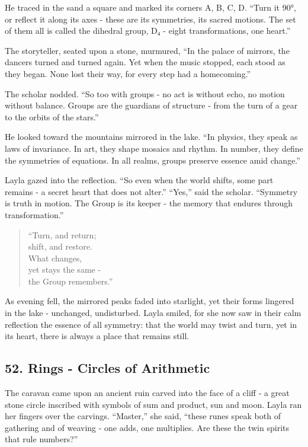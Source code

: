 \documentclass[
  letterpaper,
  DIV=11,
  numbers=noendperiod]{scrreprt}
\begin{document}
He traced in the sand a square and marked its corners A, B, C, D. ``Turn
it 90°, or reflect it along its axes - these are its symmetries, its
sacred motions. The set of them all is called the dihedral group, D₄ -
eight transformations, one heart.''

The storyteller, seated upon a stone, murmured, ``In the palace of
mirrors, the dancers turned and turned again. Yet when the music
stopped, each stood as they began. None lost their way, for every step
had a homecoming.''

The scholar nodded. ``So too with groups - no act is without echo, no
motion without balance. Groups are the guardians of structure - from the
turn of a gear to the orbits of the stars.''

He looked toward the mountains mirrored in the lake. ``In physics, they
speak as laws of invariance. In art, they shape mosaics and rhythm. In
number, they define the symmetries of equations. In all realms, groups
preserve essence amid change.''

Layla gazed into the reflection. ``So even when the world shifts, some
part remains - a secret heart that does not alter.'' ``Yes,'' said the
scholar. ``Symmetry is truth in motion. The Group is its keeper - the
memory that endures through transformation.''

\begin{quote}
``Turn, and return;\\
shift, and restore.\\
What changes,\\
yet stays the same -\\
the Group remembers.''
\end{quote}

As evening fell, the mirrored peaks faded into starlight, yet their
forms lingered in the lake - unchanged, undisturbed. Layla smiled, for
she now saw in their calm reflection the essence of all symmetry: that
the world may twist and turn, yet in its heart, there is always a place
that remains still.

\subsection{52. Rings - Circles of
Arithmetic}\label{rings---circles-of-arithmetic}

The caravan came upon an ancient ruin carved into the face of a cliff -
a great stone circle inscribed with symbols of sum and product, sun and
moon. Layla ran her fingers over the carvings. ``Master,'' she said,
``these runes speak both of gathering and of weaving - one adds, one
multiplies. Are these the twin spirits that rule numbers?''
\end{document}
